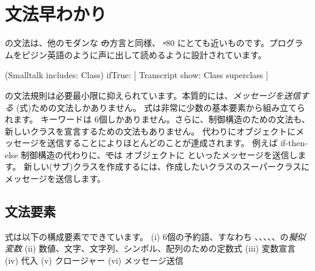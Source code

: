 \documentclass[a4paper,10pt,twoside]{book}
\begin{document}
	\renewcommand{\nnbb}[2]{} %
	\sloppy
\fi
\chapter{文法早わかり}



\pharo の文法は、他のモダンな \st の方言と同様、 \st-80 にとても近いものです。プログラムをピジン英語のように声に出して読めるように設計されています。

\begin{code}{}
(Smalltalk includes: Class) ifTrue: [ Transcript show: Class superclass ]
\end{code}

\noindent
\pharo の文法規則は必要最小限に抑えられています。本質的には、\emph{メッセージを送信する} (\ie 式)ための文法しかありません。
式は非常に少数の基本要素から組み立てられます。
キーワードは 6個しかありません。さらに、制御構造のための文法も、新しいクラスを宣言するための文法もありません。
代わりにオブジェクトにメッセージを送信することによりほとんどのことが達成されます。
例えば if-then-else 制御構造の代わりに、\st では  オブジェクトに  といったメッセージを送信します。
新しい\mbox{(サブ)クラス}を作成するには、作成したいクラスのスーパークラスにメッセージを送信します。

\section{文法要素}

式は以下の構成要素でできています。
(i) 6個の予約語、すなわち 、、、、、の\emph{擬似変数}
(ii) 数値、文字、文字列、シンボル、配列のための定数式
(iii) 変数宣言
(iv) 代入
(v) クロージャー
(vi) メッセージ送信
\end{document}
